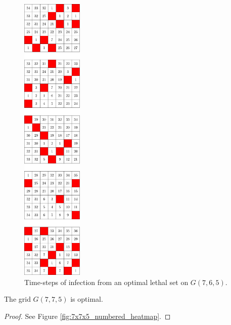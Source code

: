 \begin{figure}[H]
\centering
\includegraphics[width=0.26\textwidth]{figures/A/7x6x5_numbered_heatmap.pdf}
\caption{Time-steps of infection from an optimal lethal set on $G(7,6,5)$.}
\label{fig:7x6x5_numbered_heatmap}
\end{figure}

\newpage

\begin{con}
\label{con:7x7x5}
The grid $G(7,7,5)$ is optimal.
\end{con}

\begin{proof}
See Figure \ref{fig:7x7x5_numbered_heatmap}.
\end{proof}


